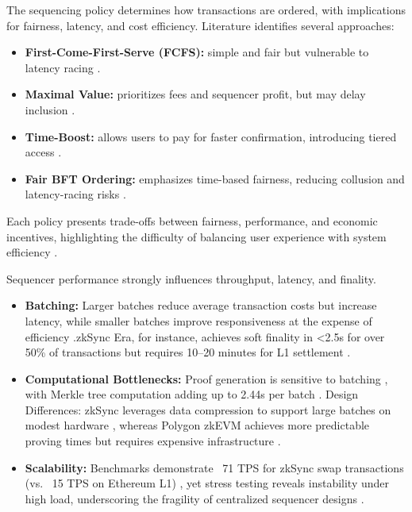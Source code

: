 
The sequencing policy determines how transactions are ordered, with implications for fairness, latency, and cost efficiency. Literature identifies several approaches:
\vspace{12pt}

\begin{itemize}
    \item \textbf{First-Come-First-Serve (FCFS):} simple and fair but vulnerable to latency racing \cite{motepalli2023sok}.
    \item \textbf{Maximal Value:} prioritizes fees and sequencer profit, but may delay inclusion \cite{gogol2025scalingdefi}.
    \item  \textbf{Time-Boost:} allows users to pay for faster confirmation, introducing tiered access \cite{motepalli2023sok}.
    \item \textbf{Fair BFT Ordering:} emphasizes time-based fairness, reducing collusion and latency-racing risks \cite{motepalli2023sok}.
\end{itemize}
\vspace{12pt}
Each policy presents trade-offs between fairness, performance, and economic incentives, highlighting the difficulty of balancing user experience with system efficiency \cite{motepalli2023sok}.


Sequencer performance strongly influences throughput, latency, and finality.
\vspace{12pt}

\begin{itemize}
    \item \textbf{Batching:} Larger batches reduce average transaction costs but increase latency, while smaller batches improve responsiveness at the expense of efficiency \cite{ethScalingDocs}.zkSync Era, for instance, achieves soft finality in \textless 2.5s for over 50\% of transactions but requires 10–20 minutes for L1 settlement \cite{gogol2025scalingdefi}.
    \item \textbf{Computational Bottlenecks:} Proof generation is sensitive to batching \cite{chaliasos2024analyzing}, with Merkle tree computation adding up to 2.44s per batch \cite{gogol2025scalingdefi}. Design Differences: zkSync leverages data compression to support large batches on modest hardware \cite{chaliasos2024analyzing}, whereas Polygon zkEVM achieves more predictable proving times but requires expensive infrastructure \cite{chaliasos2024analyzing}.
    \item  \textbf{Scalability:} Benchmarks demonstrate ~71 TPS for zkSync swap transactions (vs. ~15 TPS on Ethereum L1) \cite{gogol2025scalingdefi}, yet stress testing reveals instability under high load, underscoring the fragility of centralized sequencer designs \cite{gogol2025scalingdefi}.
\end{itemize}

